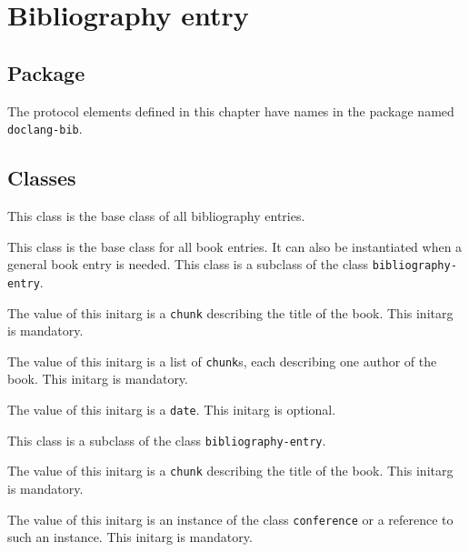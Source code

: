 \chapter{Bibliography entry}
\label{chap-bibliography-entry}

\section{Package}

The protocol elements defined in this chapter have names in the
package named \texttt{doclang-bib}.

\section{Classes}


This class is the base class of all bibliography entries.


This class is the base class for all book entries.  It can also be
instantiated when a general book entry is needed.  This class is a
subclass of the class \texttt{bibliography-entry}.


The value of this initarg is a \texttt{chunk} describing the title of
the book.  This initarg is mandatory.


The value of this initarg is a list of \texttt{chunk}s, each
describing one author of the book.  This initarg is mandatory.



The value of this initarg is a \texttt{date}.  This initarg is
optional.


This class is a subclass of the class \texttt{bibliography-entry}.


The value of this initarg is a \texttt{chunk} describing the title of
the book.  This initarg is mandatory.


The value of this initarg is an instance of the class
\texttt{conference} or a reference to such an instance.  This initarg
is mandatory.
